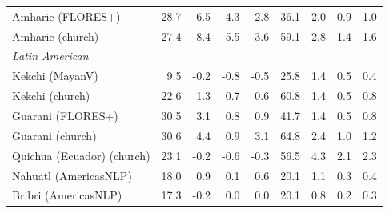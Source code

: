 \begin{table}[htbp]
\begin{tabular}{lrrrrrrrr}
Amharic (FLORES+) & 28.7 & \cellcolor{loss!45}6.5 & \cellcolor{loss!30}4.3 & \cellcolor{loss!19}2.8 & 36.1 & \cellcolor{loss!13}2.0 & \cellcolor{loss!6}0.9 & \cellcolor{loss!7}1.0 \\
Amharic (church) & 27.4 & \cellcolor{loss!58}8.4 & \cellcolor{loss!38}5.5 & \cellcolor{loss!25}3.6 & 59.1 & \cellcolor{loss!19}2.8 & \cellcolor{loss!10}1.4 & \cellcolor{loss!11}1.6 \\
\midrule \multicolumn{9}{l}{\textit{Latin American}} \\
Kekchi (MayanV) & 9.5 & -0.2 & -0.8 & -0.5 & 25.8 & \cellcolor{loss!9}1.4 & \cellcolor{loss!3}0.5 & \cellcolor{loss!3}0.4 \\
Kekchi (church) & 22.6 & \cellcolor{loss!9}1.3 & \cellcolor{loss!5}0.7 & \cellcolor{loss!4}0.6 & 60.8 & \cellcolor{loss!10}1.4 & \cellcolor{loss!3}0.5 & \cellcolor{loss!6}0.8 \\
Guarani (FLORES+) & 30.5 & \cellcolor{loss!21}3.1 & \cellcolor{loss!5}0.8 & \cellcolor{loss!6}0.9 & 41.7 & \cellcolor{loss!10}1.4 & \cellcolor{loss!4}0.5 & \cellcolor{loss!5}0.8 \\
Guarani (church) & 30.6 & \cellcolor{loss!30}4.4 & \cellcolor{loss!6}0.9 & \cellcolor{loss!21}3.1 & 64.8 & \cellcolor{loss!17}2.4 & \cellcolor{loss!7}1.0 & \cellcolor{loss!8}1.2 \\
Quichua (Ecuador) (church) & 23.1 & -0.2 & -0.6 & -0.3 & 56.5 & \cellcolor{loss!30}4.3 & \cellcolor{loss!14}2.1 & \cellcolor{loss!16}2.3 \\
Nahuatl (AmericasNLP) & 18.0 & \cellcolor{loss!6}0.9 & \cellcolor{loss!0}0.1 & \cellcolor{loss!4}0.6 & 20.1 & \cellcolor{loss!8}1.1 & \cellcolor{loss!2}0.3 & \cellcolor{loss!3}0.4 \\
Bribri (AmericasNLP) & 17.3 & -0.2 & \cellcolor{loss!0}0.0 & \cellcolor{loss!0}0.0 & 20.1 & \cellcolor{loss!5}0.8 & \cellcolor{loss!1}0.2 & \cellcolor{loss!2}0.3 \\
\bottomrule
\end{tabular}
\end{table}

